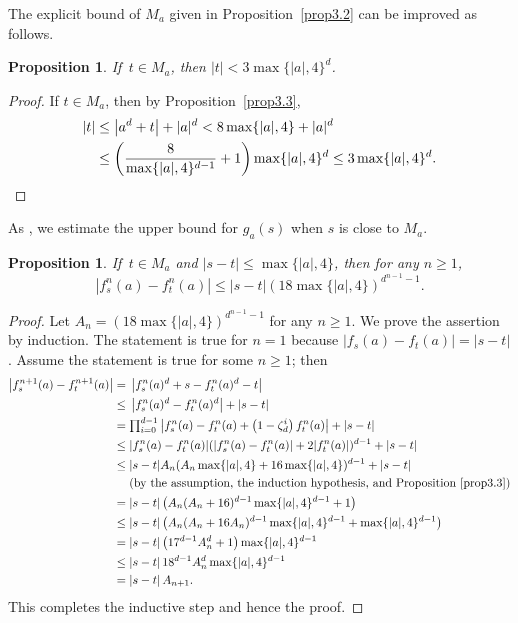 \documentclass[11pt]{amsart}
\numberwithin{equation}{section}
\theoremstyle{plain}
\newtheorem{prop}[thm]{Proposition}
\theoremstyle{definition}
\theoremstyle{remark}
\begin{document}
The explicit bound of $M_{a}$ given in Proposition~\ref{prop3.2}
can be improved as follows.

\begin{prop}\label{prop3.4}
  If\, $t\in M_{a}$, then $|t|<3\max\{|a|,4\}^{d}$.
\end{prop}

\begin{proof}
If $t\in M_{a}$, then by Proposition~\ref{prop3.3},
\begin{align*}
|t| & \leq\left|a^{d}+t\right|+|a|^{d}<8\max\{|a|,4\}+|a|^{d}\\
 & \leq\left(\frac{8}{\max\{|a|,4\}^{d-1}}+1\right)\max\{|a|,4\}^{d}\leq3\max\{|a|,4\}^{d}.\qedhere
\end{align*}
\end{proof}

As \cite[Section 3.3]{DKY2}, we estimate the upper bound for $g_{a}(s)$
when $s$ is close to $M_{a}$.

\begin{prop}\label{prop3.5}
  If\, $t\in M_{a}$ and $|s-t|\leq\max\{|a|,4\}$, then for any $n\geq1$,
\[
\left|f_{s}^{n}(a)-f_{t}^{n}(a)\right|\leq|s-t|(18\max\{|a|,4\})^{d^{n-1}-1}.
\]
\end{prop}

\begin{proof}
Let $A_{n}=(18\max\{|a|,4\})^{d^{n-1}-1}$ for any $n\geq1$. We prove
the assertion by induction. 
The statement is true for $n=1$ because $|f_{s}(a)-f_{t}(a)|=|s-t|$. 
Assume the statement is true for
some $n\geq1$; then
\allowdisplaybreaks
\begin{align*}
\left|f_{s}^{n+1}(a)-f_{t}^{n+1}(a)\right|
=\; & \left|f_{s}^{n}(a)^{d}+s-f_{t}^{n}(a)^{d}-t\right|\\
\leq\; & \left|f_{s}^{n}(a)^{d}-f_{t}^{n}(a)^{d}\right|+|s-t|\\
=\; & {\textstyle \prod_{i=0}^{d-1}}\left|f_{s}^{n}(a)-f_{t}^{n}(a)+\left(1-\zeta_{d}^{i}\right)f_{t}^{n}(a)\right|+|s-t|\\
\leq\; & |f_{s}^{n}(a)-f_{t}^{n}(a)|(|f_{s}^{n}(a)-f_{t}^{n}(a)|+2|f_{t}^{n}(a)|)^{d-1}+|s-t|\\
\leq\; & |s-t|A_{n}(A_{n}\max\{|a|,4\}+16\max\{|a|,4\})^{d-1}+|s-t|\\
 & \text{(by the assumption, the induction hypothesis, and Proposition~\ref{prop3.3})}\\
=\; & |s-t|\left(A_{n}(A_{n}+16)^{d-1}\max\{|a|,4\}^{d-1}+1\right)\\
\leq\; & |s-t|\left(A_{n}(A_{n}+16A_{n})^{d-1}\max\{|a|,4\}^{d-1}+\max\{|a|,4\}^{d-1}\right)\\
=\; & |s-t|\left(17^{d-1}A_{n}^{d}+1\right)\max\{|a|,4\}^{d-1}\\
\leq\; & |s-t|\,18^{d-1}A_{n}^{d}\max\{|a|,4\}^{d-1}\\
=\; & |s-t|\,A_{n+1}.
\end{align*}
This completes the inductive step and hence the proof.
\end{proof}
\end{document}

